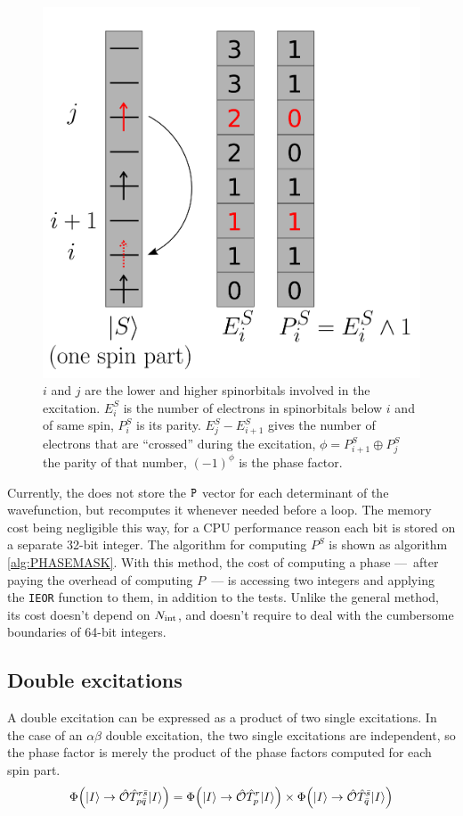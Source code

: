 \documentclass[./thesis.tex]{subfiles}
\begin{document}
                
\begin{figure}[h!]
	\begin{center}
		\includegraphics[width=0.5\columnwidth]{figures/determinant_driven/phase}
		\caption[phase mask illustration]{
		$i$ and $j$ are the lower and higher spinorbitals involved in the excitation. $E_i^S$ is the number of electrons in spinorbitals below $i$ and of same spin, $P_i^S$ is its parity. $E_j^S - E_{i+1}^S$ gives the number of electrons that are ``crossed'' during the excitation, $\phi = P^S_{i+1} \oplus P^S_j$ the parity of that number, $(-1)^\phi$ is the phase factor.
		}
		\label{generators_selectors}
	\end{center}
\end{figure}


Currently, the \QP does not store the ${\texttt{P}}$ vector for each determinant of the wavefunction, but recomputes it whenever needed before a loop. The memory cost being negligible this way, for a CPU performance reason each bit is stored on a separate 32-bit integer.
The algorithm for computing $P^S$ is shown as algorithm \ref{alg:PHASEMASK}. 
With this method, the cost of computing a phase ---~after paying the overhead of computing $P$~--- is accessing two integers and applying the \lstinline{IEOR} function to them, in addition to the tests. Unlike the general method, its cost doesn't depend on ${N_\text{int}}$, and doesn't require to deal with the cumbersome boundaries of 64-bit integers.



\subsection{Double excitations}


A double excitation can be expressed as a product of two single excitations.
In the case of an $\alpha \beta$ double excitation, the two single excitations are independent, so the phase factor is merely the product of the phase factors computed for each spin part. 
\begin{equation}
{\Phi \qty({\ket{I}}\rightarrow {\hat{\mathcal{O}}}{\hat{T}_{p \bar q}^{r \bar s}} {\ket{I}})} = 
{\Phi \qty({\ket{I}} \rightarrow {\hat{\mathcal{O}}} {\hat{T}_{p}^{r}} {\ket{I}})} \times
{\Phi \qty({\ket{I}}\rightarrow {\hat{\mathcal{O}}}{\hat{T}_{\bar q}^{\bar s}} {\ket{I}})} 
\end{equation}
\end{document}
